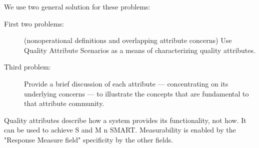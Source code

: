 \documentclass[../Main.tex]{subfiles}
\begin{document}
We use two general solution for these problems:
\begin{description}
    \item[First two problems:] (nonoperational definitions and overlapping attribute concerns) Use
    Quality Attribute Scenarios as a means of characterizing quality attributes.
    \item[Third problem:] Provide a brief discussion of each attribute — concentrating on its underlying
    concerns — to illustrate the concepts that are fundamental to that attribute community.
\end{description}

Quality attributes describe how a system provides its functionality, not how.
It can be used to achieve S and M n SMART.
Measurability is enabled by the "Response Measure field" specificity by the other fields.
\end{document}
